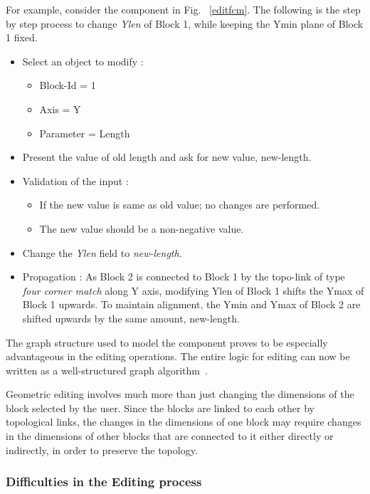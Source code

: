 	For example, consider the component in Fig. ~\ref{editfcm}. 
	The following is the step by step
	process to change {\em Ylen} of Block 1, while keeping the Ymin plane of 
	Block 1 fixed.
	
	\begin{itemize}
		\item
		Select an object to modify :
						\begin{itemize}
						\item
						Block-Id = 1
						\item
						Axis = Y
						\item
						Parameter = Length
						\end{itemize}
		\item
		Present the value of old length and ask for new value, new-length.
		\item
		Validation of the input :
						\begin{itemize}
						\item
						If the new value is same as old value; no changes
						are performed.
						\item
						The new value should be a non-negative value.
						\end{itemize}
		\item
		Change the {\em Ylen} field to {\em new-length}.

		\item
		Propagation : As Block 2 is connected to Block 1 by the topo-link of 
		type
		{\em four corner match} along Y axis, modifying Ylen of Block 1 
		shifts the Ymax of Block 1 upwards. To maintain alignment,
		the Ymin and Ymax of Block 2 are shifted upwards by the same
		amount, new-length.

	\end{itemize}


    The graph structure used to model the component proves to be especially 
	advantageous in the editing  operations. The entire logic for editing
	can now be written as a well-structured graph algorithm~\cite{Howard}.


    Geometric editing involves much more than just changing the dimensions of
    the block selected by the user. Since the blocks are linked
    to each other by topological links, the changes in the dimensions of one 
	block may
    require changes in the dimensions of other blocks that are connected to it
	either directly or indirectly, in order to preserve the topology.

	
	\subsubsection{Difficulties in the Editing process}

